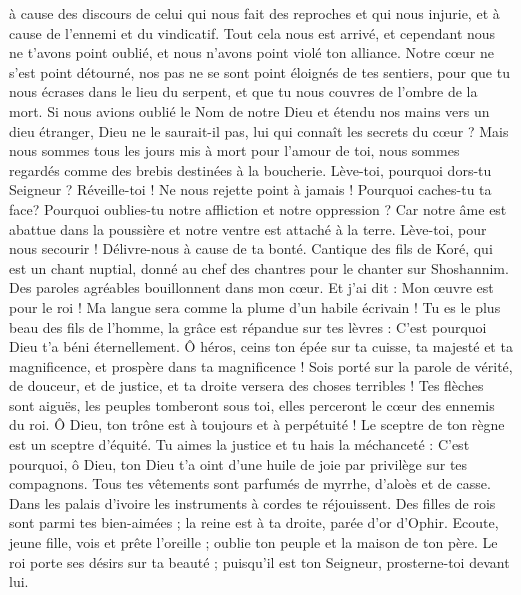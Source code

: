 \begin{multicols}{2}
à cause des discours de celui qui nous fait des reproches et qui nous injurie, et à cause de l'ennemi et du vindicatif.
Tout cela nous est arrivé, et cependant nous ne t'avons point oublié, et nous n'avons point violé ton alliance.
Notre cœur ne s'est point détourné, nos pas ne se sont point éloignés de tes sentiers,
pour que tu nous écrases dans le lieu du serpent, et que tu nous couvres de l'ombre de la mort.
Si nous avions oublié le Nom de notre Dieu et étendu nos mains vers un dieu étranger,
Dieu ne le saurait-il pas, lui qui connaît les secrets du cœur ?
Mais nous sommes tous les jours mis à mort pour l'amour de toi, nous sommes regardés comme des brebis destinées à la boucherie.
Lève-toi, pourquoi dors-tu Seigneur ? Réveille-toi ! Ne nous rejette point à jamais !
Pourquoi caches-tu ta face? Pourquoi oublies-tu notre affliction et notre oppression ?
Car notre âme est abattue dans la poussière et notre ventre est attaché à la terre.
Lève-toi, pour nous secourir ! Délivre-nous à cause de ta bonté.
\VerseOne{}Cantique des fils de Koré, qui est un chant nuptial, donné au chef des chantres pour le chanter sur Shoshannim.
Des paroles agréables bouillonnent dans mon cœur. Et j'ai dit : Mon œuvre est pour le roi ! Ma langue sera comme la plume d'un habile écrivain !
Tu es le plus beau des fils de l'homme, la grâce est répandue sur tes lèvres : C'est pourquoi Dieu t'a béni éternellement.
Ô héros, ceins ton épée sur ta cuisse, ta majesté et ta magnificence,
et prospère dans ta magnificence ! Sois porté sur la parole de vérité, de douceur, et de justice, et ta droite versera des choses terribles !
Tes flèches sont aiguës, les peuples tomberont sous toi, elles perceront le cœur des ennemis du roi.
Ô Dieu, ton trône est à toujours et à perpétuité ! Le sceptre de ton règne est un sceptre d'équité.
Tu aimes la justice et tu hais la méchanceté : C'est pourquoi, ô Dieu, ton Dieu t'a oint d'une huile de joie par privilège sur tes compagnons.
Tous tes vêtements sont parfumés de myrrhe, d'aloès et de casse. Dans les palais d'ivoire les instruments à cordes te réjouissent.
Des filles de rois sont parmi tes bien-aimées ; la reine est à ta droite, parée d'or d'Ophir.
Ecoute, jeune fille, vois et prête l'oreille ; oublie ton peuple et la maison de ton père.
Le roi porte ses désirs sur ta beauté ; puisqu'il est ton Seigneur, prosterne-toi devant lui.

\end{multicols}

